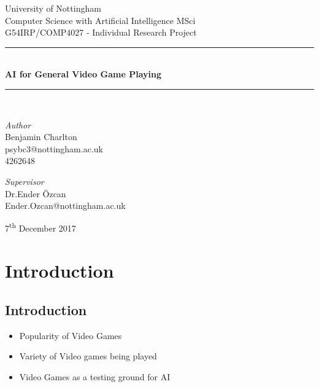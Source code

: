 \documentclass[a4paper]{article}
\begin{document}
\begin{titlepage}
	\newcommand{\HRule}{\rule{\linewidth}{0.5mm}}
	\center{}

	\LARGE{University of Nottingham}\\[1.5cm]
	\Large{Computer Science with Artificial Intelligence MSci}\\[0.5cm]
	\large{G54IRP/COMP4027 - Individual Research Project}\\[0.5cm]

	\HRule{}\\[0.4cm]
	{\huge\bfseries AI for General Video Game Playing}\\[0.4cm]
	\HRule{}\\[1.5cm]

	\begin{minipage}{0.4\textwidth}
		\begin{flushleft}
			\large
			\textit{Author}\\
			Benjamin Charlton\\
            psybc3@nottingham.ac.uk\\
            4262648
		\end{flushleft}
	\end{minipage}
    \begin{minipage}{0.4\textwidth}
		\begin{flushright}
			\large
			\textit{Supervisor}\\
			Dr.\@ Ender \"Ozcan\\
            Ender.Ozcan@nottingham.ac.uk
		\end{flushright}
	\end{minipage}

	\vfill\vfill\vfill
	{\large7\textsuperscript{th} December 2017}
	\vfill

\end{titlepage}

\tableofcontents
\pagebreak

\section{Introduction}
\subsection{Introduction}
\begin{itemize}
    \item Popularity of Video Games
    \item Variety of Video games being played
    \item Video Games as a testing ground for AI
\end{itemize}
\end{document}
